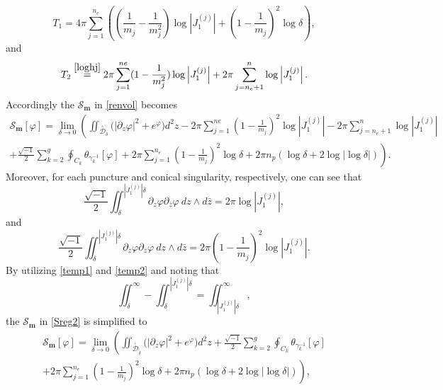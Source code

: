\documentclass[a4paper,11pt]{article}
\newcommand{\singfund}{\overset{{}_{\curlywedge}}{\mathcal{D}}}
\begin{document}
\begin{equation}
T_1  = 4\pi \sum_{j=1}^{n_e} \left(   (\frac{1}{m_j}-\frac{1}{m_j^2}) \log \left|J_1^{(j)}\right|+   (1-\frac{1}{m_j})^2 \log \delta \right),
\label{bdterm}
\end{equation}
and
\begin{equation}
T_2 \overset{\eqref{loghj}}{=} 2\pi \sum_{j=1}^{ne} (1-\frac{1}{m_j^2}) \log\left|J_{1}^{(j)}\right| +2\pi \sum_{j=n_e+1}^{n} \log\left|J_{1}^{(j)}\right|.
\end{equation}
Accordingly the $\mathscr{S}_{\boldsymbol{m}} $ in \eqref{renvol} becomes
\begin{multline}
\mathscr{S}_{\boldsymbol{m}}[\varphi]  = \lim_{\delta \to 0} \left(\iint_{\singfund_{\delta}} \Big(
|\partial_z \varphi|^2 + e^\varphi
\Big) d^2z - 2\pi \sum_{j=1}^{ne} (1-\frac{1}{m_j})^2 \log\left|J_{1}^{(j)}\right| -2\pi \sum_{j=n_e+1}^{n} \log\left|J_{1}^{(j)}\right|\right. \\ \left. + \frac{\sqrt{-1}}{2} \sum_{k=2}^{g} \oint_{C_k} \theta_{\gamma_k^{-1}}[\varphi]+2\pi \sum_{j=1}^{n_e} (1-\frac{1}{m_j})^2 \log \delta + 2\pi n_p \left(
\log\delta + 2\log \left|\log \delta\right|
\right)\right).
\label{Sreg2}
\end{multline}
Moreover, for each puncture and conical singularity, respectively, one can see that
\begin{equation}
\frac{\sqrt{-1}}{2} \iint_{\delta}^{\left|J_{1}^{(j)}\right|\delta} \partial_z \varphi \partial_{\bar{z} }\varphi ~dz\wedge d\bar{z} = 2\pi \log\left|J_{1}^{(j)}\right|,
\label{temp1}
\end{equation}
and
\begin{equation}
\frac{\sqrt{-1}}{2} \iint_{\delta}^{\left|J_{1}^{(j)}\right|\delta} \partial_z \varphi \partial_{\bar{z}}  \varphi ~dz \wedge d\bar{z} =  2\pi (1-\frac{1}{m_j})^2 \log\left|J_{1}^{(j)}\right|.
\label{temp2}
\end{equation}
By utilizing \eqref{temp1} and \eqref{temp2} and noting that
\begin{equation} \iint_{\delta}^{\infty}  -\iint_{\delta}^{\left|J_{1}^{(j)}\right|\delta}=\iint_{\left|J_{1}^{(j)}\right|\delta}^{\infty},\nonumber
\end{equation}
the $\mathscr{S}_{\boldsymbol{m}}$ in \eqref{Sreg2} is simplified to
\begin{multline}
\mathscr{S}_{\boldsymbol{m}}[\varphi]  =\lim_{\delta \to 0} \left( \iint_{\singfund_{\tilde\delta}} \Big(
|\partial_z \varphi|^2 + e^\varphi
\Big) d^2z + \frac{\sqrt{-1}}{2} \sum_{k=2}^{g} \oint_{C_k} \theta_{\gamma_k^{-1}}[\varphi]\right. \\ \left. +2\pi \sum_{j=1}^{n_e} \left(1-\frac{1}{m_j}\right)^2 \log \delta + 2\pi n_p \left(
\log\delta + 2\log \left|\log \delta\right|
\right)\right),
\label{Sreg3}
\end{multline}
\end{document}
